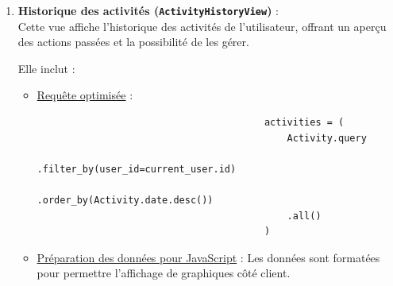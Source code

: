 \documentclass[a4paper,11pt]{article}
\begin{document}
\begin{enumerate}
                    \item \textbf{Historique des activités (\texttt{ActivityHistoryView})} :\\
                        Cette vue affiche l'historique des activités de l'utilisateur, offrant un aperçu des actions passées et la possibilité de les gérer.

                        \noindent Elle inclut :

                        \begin{itemize}
                            \item \underline{Requête optimisée} :
                                \begin{tcolorbox}[colback=lightgray!6, colframe=black, left=-60mm, right=5mm, top=2mm, bottom=0mm, boxrule=0.1mm]
                                    \begin{verbatim}
                                        activities = (
                                            Activity.query
                                            .filter_by(user_id=current_user.id)
                                            .order_by(Activity.date.desc())
                                            .all()
                                        )
                                    \end{verbatim}
                                \end{tcolorbox}

                            \item \underline{Préparation des données pour JavaScript} : Les données sont formatées pour permettre l'affichage de graphiques côté client.


\end{itemize}
\end{enumerate}
\end{document}

